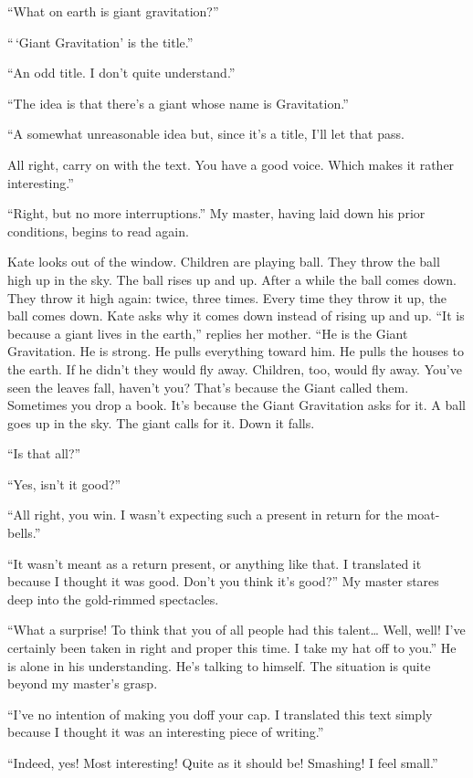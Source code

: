 \documentclass[12pt, openright]{book}
\begin{document}
``What on earth is giant gravitation?''

``\,`Giant Gravitation' is the title.''

``An odd title. I don't quite understand.''

``The idea is that there's a giant whose name is Gravitation.''

``A somewhat unreasonable idea but, since it's a title, I'll let that
pass.

All right, carry on with the text. You have a good voice. Which makes it
rather interesting.''

``Right, but no more interruptions.'' My master, having laid down his
prior conditions, begins to read again.

Kate looks out of the window. Children are playing ball. They throw the
ball high up in the sky. The ball rises up and up. After a while the
ball comes down. They throw it high again: twice, three times. Every
time they throw it up, the ball comes down. Kate asks why it comes down
instead of rising up and up. ``It is because a giant lives in the
earth,'' replies her mother. ``He is the Giant Gravitation. He is
strong. He pulls everything toward him. He pulls the houses to the
earth. If he didn't they would fly away. Children, too, would fly away.
You've seen the leaves fall, haven't you? That's because the Giant
called them. Sometimes you drop a book. It's because the Giant
Gravitation asks for it. A ball goes up in the sky. The giant calls for
it. Down it falls.

``Is that all?''

``Yes, isn't it good?''

``All right, you win. I wasn't expecting such a present in return for
the moat-bells.''

``It wasn't meant as a return present, or anything like that. I
translated it because I thought it was good. Don't you think it's
good?'' My master stares deep into the gold-rimmed spectacles.

``What a surprise! To think that you of all people had this
talent\ldots{} Well, well! I've certainly been taken in right and proper
this time. I take my hat off to you.'' He is alone in his understanding.
He's talking to himself. The situation is quite beyond my master's
grasp.

``I've no intention of making you doff your cap. I translated this text
simply because I thought it was an interesting piece of writing.''

``Indeed, yes! Most interesting! Quite as it should be! Smashing! I feel
small.''
\end{document}
